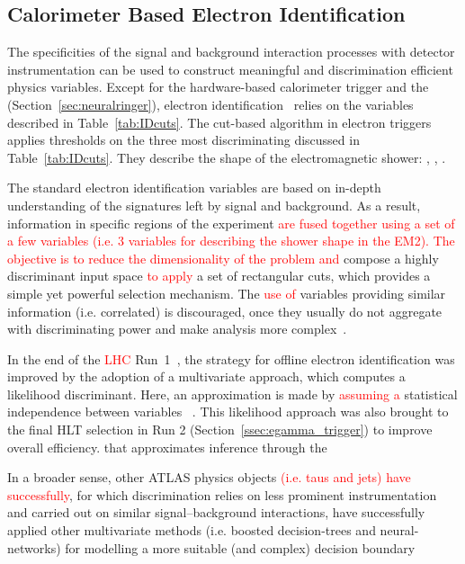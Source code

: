 \subsection{Calorimeter Based Electron Identification}\label{ssec:std_variables}

The specificities of the signal and background interaction processes with
detector instrumentation can be used to construct meaningful and discrimination
efficient physics variables. Except for the hardware-based calorimeter trigger
and the \rnn (Section~\ref{sec:neuralringer}), electron
identification~\cite{atlas_electron_id_offline} relies on the variables
described in Table~\ref{tab:IDcuts}. 
The cut-based algorithm in electron
triggers applies thresholds on the three most discriminating discussed in Table~\ref{tab:IDcuts}. They describe the shape of the electromagnetic shower: \reta{}, \eratio{}, \rhadone{}.




  
The standard electron identification variables are based on in-depth
understanding of the signatures left by signal and background.  As a result, information in specific regions of the experiment
\textcolor{red}{are fused together using a set of a few variables (i.e. 3 variables for describing the shower shape in the EM2). The objective is to reduce the dimensionality of the problem and} compose a highly discriminant input space \textcolor{red}{to apply} a set of rectangular cuts, which provides a simple yet powerful selection mechanism. The \textcolor{red}{use of} variables providing similar information
(i.e. correlated) is discouraged, once they usually do not aggregate with
discriminating power and make analysis more
complex~\cite{aaboud2019electron}.

In the end of the \textcolor{red}{LHC} Run~1~\cite{PERF-2016-01}, the strategy for offline electron identification was improved by the adoption of a multivariate approach, which computes a likelihood discriminant. Here, an approximation is made by \textcolor{red}{assuming a} statistical independence between variables ~\cite{kendalls_vol2b}. This likelihood approach was also brought to the final HLT selection in Run 2 (Section~\ref{ssec:egamma_trigger}) to improve overall efficiency. that approximates inference through the

In a broader sense, other ATLAS physics objects \textcolor{red}{(i.e. taus and jets) have successfully}, for
which discrimination relies on less prominent instrumentation and carried out on
similar signal--background interactions, have successfully applied other
multivariate methods (i.e. boosted decision-trees and neural-networks) for
modelling a more suitable (and complex) decision boundary



